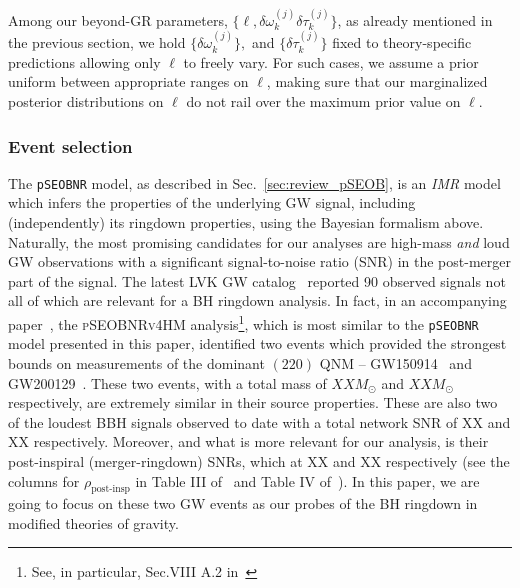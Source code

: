 \documentclass[twocolumn,
               prd,
               aps,
               superscriptaddress,
               tightenlines,
               nofootinbib,
               eqsecnum,
               amsfonts,
               amsmath,
               longbibliography]{revtex4-1}
\newcommand{\Mo}{M_{\odot}}
\newcommand{\pSEOB}{\texttt{pSEOBNR}}
\begin{document}
Among our beyond-GR parameters, $\{\ell, \delta \omega_k^{(j)}\delta \tau_k^{(j)}\}$,
as already mentioned in the previous section, we hold $\{\delta \omega_k^{(j)}\},$
and $\{\delta \tau_k^{(j)}\}$ fixed to theory-specific predictions allowing only $\ell$
to freely vary.
%
For such cases, we assume a prior uniform between appropriate ranges on $\ell$,
making sure that our marginalized posterior distributions on $\ell$ do not rail
over the maximum prior value on $\ell$.


\subsubsection{Event selection}

The \pSEOB{} model, as described in Sec.~\ref{sec:review_pSEOB}, is an
\emph{IMR} model which infers the properties of the underlying GW signal,
including (independently) its ringdown properties, using the Bayesian formalism
above. Naturally, the most promising candidates for our analyses are high-mass
\emph{and} loud GW observations with a significant signal-to-noise ratio (SNR)
in the post-merger part of the signal.
%
The latest LVK GW catalog~\cite{LIGOScientific:2021djp} reported 90 observed
signals not all of which are relevant for a BH ringdown analysis. In fact, in
an accompanying paper~\cite{LIGOScientific:2021sio}, the \textsc{pSEOBNRv4HM}
analysis\footnote{See, in particular, Sec.VIII A.2
in~\cite{LIGOScientific:2021sio}}, which is most similar to the \pSEOB{} model
presented in this paper, identified two events which provided the strongest
bounds on measurements of the dominant $(220)$ QNM --
GW150914~\cite{LIGOScientific:2016aoc} and
GW200129~\cite{LIGOScientific:2021djp}.
%
These two events, with a total mass of $XX \Mo$ and $XX \Mo$ respectively, are
extremely similar in their source properties. These are also two of the loudest
BBH signals observed to date with a total network SNR of XX and XX
respectively.
%
Moreover, and what is more relevant for our analysis, is their post-inspiral
(merger-ringdown) SNRs, which at XX and XX respectively (see the columns for
$\rho_{\text{post-insp}}$ in Table III of~\cite{LIGOScientific:2019fpa} and
Table IV of~\cite{LIGOScientific:2021sio}).
%
In this paper, we are going to focus on these two GW events as our probes of
the BH ringdown in modified theories of gravity.
\end{document}

